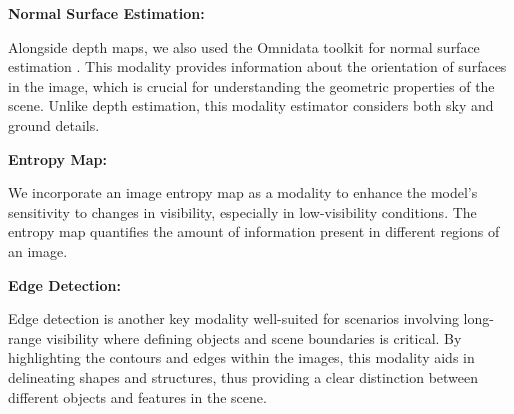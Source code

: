 \textbf{Normal Surface Estimation:}

Alongside depth maps, we also used the Omnidata toolkit for normal surface estimation \cite{eftekhar2021omnidata}. This modality provides information about the orientation of surfaces in the image, which is crucial for understanding the geometric properties of the scene. Unlike depth estimation, this modality estimator considers both sky and ground details.


\textbf{Entropy Map:}

We incorporate an image entropy map as a modality to enhance the model's sensitivity to changes in visibility, especially in low-visibility conditions. The entropy map quantifies the amount of information present in different regions of an image. 




\textbf{Edge Detection:}

Edge detection is another key modality well-suited for scenarios involving long-range visibility where defining objects and scene boundaries is critical. By highlighting the contours and edges within the images, this modality aids in delineating shapes and structures, thus providing a clear distinction between different objects and features in the scene. 



